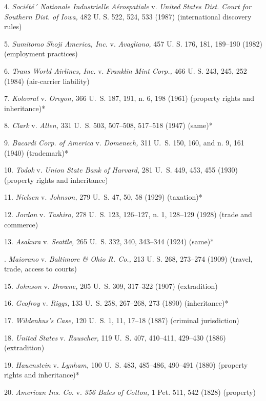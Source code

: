     4. \emph{Société´ Nationale Industrielle Aérospatiale} v.
    \emph{United States Dist. Court for Southern Dist. of Iowa,} 482 U. S.
    522, 524, 533 (1987) (international discovery rules)

    5. \emph{Sumitomo Shoji America, Inc.} v. \emph{Avagliano,} 457 U. S.
    176, 181, 189--190 (1982) (employment practices)

    6. \emph{Trans World Airlines, Inc.} v. \emph{Franklin Mint Corp.,} 466
    U. S. 243, 245, 252 (1984) (air-carrier liability)

    7. \emph{Kolovrat} v. \emph{Oregon,} 366 U.~S. 187, 191, n. 6, 198
    (1961) (property rights and inheritance)*

    8. \emph{Clark} v. \emph{Allen,} 331 U.~S. 503, 507--508, 517--518
    (1947) (same)*

    9. \emph{Bacardi Corp. of America} v. \emph{Domenech,} 311 U.~S. 150,
    160, and n. 9, 161 (1940) (trademark)*

    10. \emph{Todok} v. \emph{Union State Bank of Harvard,} 281 U.~S. 449,
    453, 455 (1930) (property rights and inheritance)

    11. \emph{Nielsen} v. \emph{Johnson,} 279 U.~S. 47, 50, 58 (1929)
    (taxation)*

    12. \emph{Jordan} v. \emph{Tashiro,} 278 U.~S. 123, 126--127, n. 1,
    128--129 (1928) (trade and commerce)

    13. \emph{Asakura} v. \emph{Seattle,} 265 U.~S. 332, 340, 343--344
    (1924) (same)*

    . \emph{Maiorano} v. \emph{Baltimore \& Ohio R. Co.,} 213 U. S.
    268, 273--274 (1909) (travel, trade, access to courts)

    15. \emph{Johnson} v. \emph{Browne,} 205 U.~S. 309, 317--322 (1907)
    (extradition)

    16. \emph{Geofroy} v. \emph{Riggs,} 133 U.~S. 258, 267--268, 273
    (1890) (inheritance)*

    17. \emph{Wildenhus's Case,} 120 U.~S. 1, 11, 17--18 (1887)
    (criminal jurisdiction)

    18. \emph{United States} v. \emph{Rauscher,} 119 U.~S. 407, 410--411,
    429--430 (1886) (extradition)

    19. \emph{Hauenstein} v. \emph{Lynham,} 100 U.~S. 483, 485--486,
    490--491 (1880) (property rights and inheritance)*

    20. \emph{American Ins. Co.} v. \emph{356 Bales of Cotton,} 1 Pet. 511,
    542 (1828) (property)

